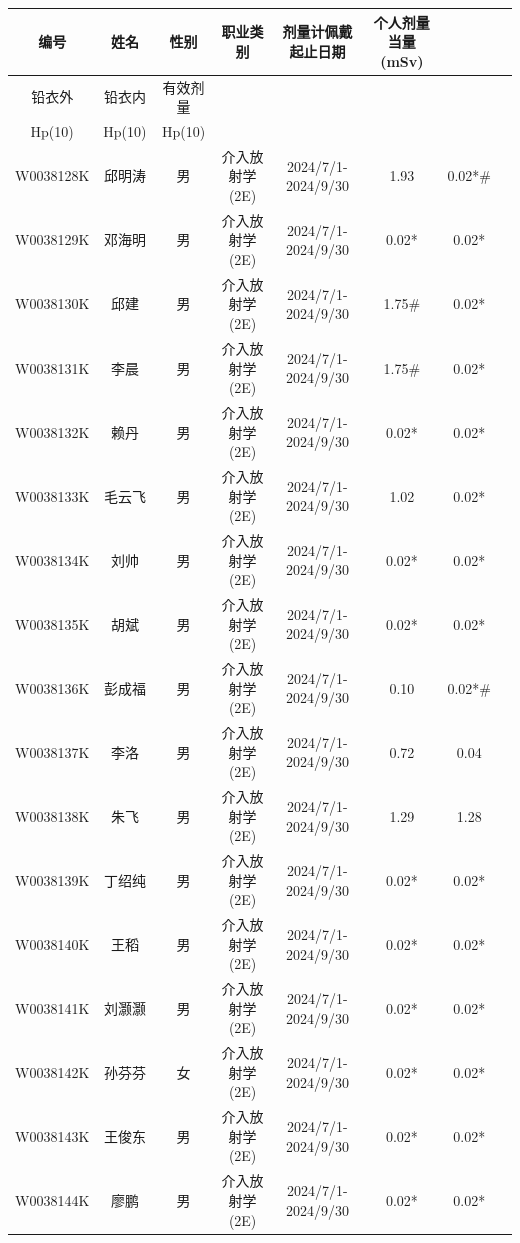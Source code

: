 \begin{table}[H]
\centering
\begin{tabular}{|c|c|c|c|c|c|c|c|}
\hline
编号 & 姓名 & 性别 & 职业类别 & 剂量计佩戴起止日期 & 个人剂量当量(mSv) &  &  \\
\hline
铅衣外 & 铅衣内 & 有效剂量 &  &  &  &  &  \\
\hline
Hp(10) & Hp(10) & Hp(10) &  &  &  &  &  \\
\hline
W0038128K & 邱明涛 & 男 & 介入放射学(2E) & 2024/7/1-2024/9/30 & 1.93 & 0.02*\# &  \\
\hline
W0038129K & 邓海明 & 男 & 介入放射学(2E) & 2024/7/1-2024/9/30 & 0.02* & 0.02* &  \\
\hline
W0038130K & 邱建 & 男 & 介入放射学(2E) & 2024/7/1-2024/9/30 & 1.75\# & 0.02* &  \\
\hline
W0038131K & 李晨 & 男 & 介入放射学(2E) & 2024/7/1-2024/9/30 & 1.75\# & 0.02* &  \\
\hline
W0038132K & 赖丹 & 男 & 介入放射学(2E) & 2024/7/1-2024/9/30 & 0.02* & 0.02* &  \\
\hline
W0038133K & 毛云飞 & 男 & 介入放射学(2E) & 2024/7/1-2024/9/30 & 1.02 & 0.02* &  \\
\hline
W0038134K & 刘帅 & 男 & 介入放射学(2E) & 2024/7/1-2024/9/30 & 0.02* & 0.02* &  \\
\hline
W0038135K & 胡斌 & 男 & 介入放射学(2E) & 2024/7/1-2024/9/30 & 0.02* & 0.02* &  \\
\hline
W0038136K & 彭成福 & 男 & 介入放射学(2E) & 2024/7/1-2024/9/30 & 0.10 & 0.02*\# &  \\
\hline
W0038137K & 李洛 & 男 & 介入放射学(2E) & 2024/7/1-2024/9/30 & 0.72 & 0.04 &  \\
\hline
W0038138K & 朱飞 & 男 & 介入放射学(2E) & 2024/7/1-2024/9/30 & 1.29 & 1.28 &  \\
\hline
W0038139K & 丁绍纯 & 男 & 介入放射学(2E) & 2024/7/1-2024/9/30 & 0.02* & 0.02* &  \\
\hline
W0038140K & 王稻 & 男 & 介入放射学(2E) & 2024/7/1-2024/9/30 & 0.02* & 0.02* &  \\
\hline
W0038141K & 刘灏灏 & 男 & 介入放射学(2E) & 2024/7/1-2024/9/30 & 0.02* & 0.02* &  \\
\hline
W0038142K & 孙芬芬 & 女 & 介入放射学(2E) & 2024/7/1-2024/9/30 & 0.02* & 0.02* &  \\
\hline
W0038143K & 王俊东 & 男 & 介入放射学(2E) & 2024/7/1-2024/9/30 & 0.02* & 0.02* &  \\
\hline
W0038144K & 廖鹏 & 男 & 介入放射学(2E) & 2024/7/1-2024/9/30 & 0.02* & 0.02* &  \\

\end{tabular}
\end{table}
